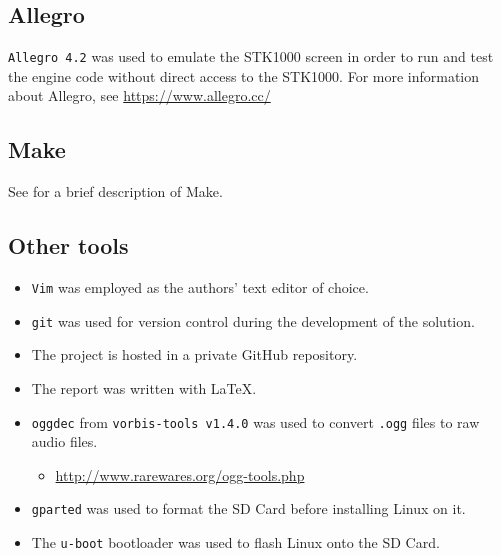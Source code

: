\subsection{Allegro}
	\texttt{Allegro 4.2} was used to emulate the STK1000 screen in order to run and test the engine code without direct access to the STK1000.
	For more information about Allegro, see \url{https://www.allegro.cc/}

\subsection{Make}
	See \cite{tdt4258-1} for a brief description of Make.

\subsection{Other tools}
	\begin{itemize}
		\item{\texttt{Vim} was employed as the authors' text editor of choice.}
		\item{\texttt{git} was used for version control during the development of the solution.}
		\item{The project is hosted in a private GitHub repository.}
		\item{The report was written with \LaTeX.}
		\item{\texttt{oggdec} from \texttt{vorbis-tools v1.4.0} was used to convert \texttt{.ogg} files to raw audio files.}
		\begin{itemize}
				\item{\url{http://www.rarewares.org/ogg-tools.php}}
		\end{itemize}
		\item{\texttt{gparted} was used to format the SD Card before installing Linux on it.}
		\item{The \texttt{u-boot} bootloader was used to flash Linux onto the SD Card.}
	\end{itemize}